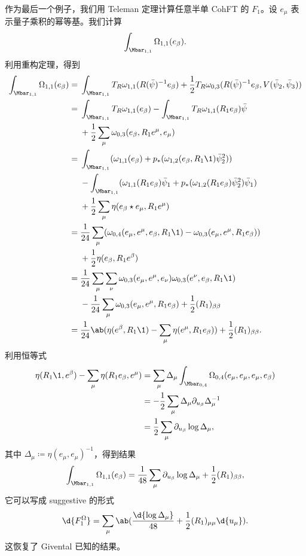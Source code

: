 \begin{exm}
    作为最后一个例子，我们用 Teleman 定理计算任意半单 CohFT 的 \(F_1\)。设 \(e_{\mu}\) 表示量子乘积的幂等基。我们计算
    \[ \int_{\Mbar_{1,1}} \Omega_{1,1}(e_{\beta}). \]
    利用重构定理，得到
    \begin{align*}
        \int_{\Mbar_{1,1}}\Omega_{1,1}(e_{\beta}) ={}& \int_{\Mbar_{1,1}} T_R \omega_{1,1}(R(\bar{\psi})^{-1} e_{\beta}) + \frac{1}{2} T_R \omega_{0,3}(R(\bar{\psi})^{-1} e_{\beta}, V(\bar{\psi}_2, \bar{\psi}_3)) \\
        ={}& \int_{\Mbar_{1,1}}T_R\omega_{1,1}(e_{\beta}) - \int_{\Mbar_{1,1}} T_R \omega_{1,1}(R_1 e_{\beta})\bar{\psi} \\ 
        &+ \frac{1}{2}\sum_{\mu}  \omega_{0,3}(e_{\beta}, R_1 e^{\mu}, e_{\mu}) \\
        ={}& \int_{\Mbar_{1,1}} ( \omega_{1,1}(e_{\beta}) + p_* ( \omega_{1,2}(e_{\beta}, R_1 \1) \bar{\psi}_2^2 )) \\
        &- \int_{\Mbar_{1,1}} (\omega_{1,1}(R_1 e_{\beta})\bar{\psi}_1 + p_* ( \omega_{1,2}(R_1 e_{\beta}) \bar{\psi}_2^2 ) \bar{\psi}_1) \\
        &+ \frac{1}{2} \sum_{\mu} \eta(e_{\beta} \star e_{\mu}, R_1 e^{\mu}) \\
        ={}& \frac{1}{24} \sum_{\mu} ( \omega_{0,4}(e_{\mu}, e^{\mu}, e_{\beta}, R_1 \1) -\omega_{0,3}(e_{\mu}, e^{\mu}, R_1 e_{\beta}) )\\
        &+ \frac{1}{2} \eta(e_{\beta}, R_1 e^{\beta}) \\
        ={}& \frac{1}{24} \sum_{\mu}\sum_{\nu} \omega_{0,3}(e_{\mu}, e^{\mu}, e_{\nu})\omega_{0,3}(e^{\nu}, e_{\beta}, R_1 \1) \\
        &-\frac{1}{24} \sum_{\mu} \omega_{0,3}(e_{\mu}, e^{\mu}, R_1 e_{\beta}) + \frac{1}{2} (R_1)_{\beta\beta} \\
        ={}& \frac{1}{24} \ab(\eta(e^{\beta}, R_1 \1) - \sum_{\mu} \eta(e^{\mu}, R_1 e_{\beta})) + \frac{1}{2} (R_1)_{\beta\beta}.
    \end{align*}
    利用恒等式
    \begin{align*}
        \eta(R_1 \1, e^{\beta}) - \sum_{\mu} \eta(R_1 e_{\beta}, e^{\mu}) &= \sum_{\mu} \Delta_{\mu} \int_{\Mbar_{0,4}} \Omega_{0,4}(e_{\mu}, e_{\mu}, e_{\mu}, e_{\beta}) \\
        &= -\frac{1}{2}\sum_{\mu} \Delta_{\mu} \partial_{u_{\beta}} \Delta_{\mu}^{-1} \\
        &= \frac{1}{2} \sum_{\mu} \partial_{u_{\beta}} \log \Delta_{\mu},
    \end{align*}
    其中 \(\Delta_{\mu} \coloneqq \eta(e_{\mu}, e_{\mu})^{-1}\)，得到结果
    \[ \int_{\Mbar_{1,1}} \Omega_{1,1}(e_{\beta}) = \frac{1}{48} \sum_{\mu} \partial_{u_{\beta}} \log \Delta_{\mu} + \frac{1}{2} (R_1)_{\beta\beta}, \]
    它可以写成 suggestive 的形式
    \[ \d{F_1^{\Omega}} = \sum_{\mu} \ab( \frac{\d{\log \Delta_{\mu}}}{48} + \frac{1}{2} (R_1)_{\mu\mu} \d{u_{\mu}} ). \]
    这恢复了 Givental 已知的结果。
\end{exm}

